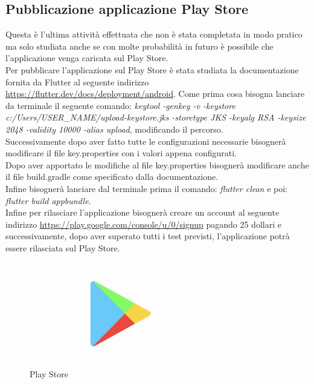 \newpage

\subsection{Pubblicazione applicazione Play Store}
Questa è l'ultima attività effettuata che non è stata completata in modo pratico ma solo studiata anche se con molte probabilità in futuro è possibile che l'applicazione venga caricata sul Play Store.\\
Per pubblicare l'applicazione sul Play Store è stata studiata la documentazione fornita da Flutter al seguente indirizzo \url{https://flutter.dev/docs/deployment/android}.
Come prima cosa bisogna lanciare da terminale il seguente comando: \textit{keytool -genkey -v -keystore c:/Users/USER\_NAME/upload-keystore.jks -storetype JKS -keyalg RSA -keysize 2048 -validity 10000 -alias upload}, modificando il percorso.\\
Successivamente dopo aver fatto tutte le configurazioni necessarie bisognerà modificare il file key.properties con i valori appena configurati.\\
Dopo aver apportato le modifiche al file key.properties bisognerà modificare anche il file build.gradle come specificato dalla documentazione.\\
Infine bisognerà lanciare dal terminale prima il comando: \textit{flutter clean} e poi: \textit{flutter build appbundle}.\\
Infine per rilasciare l'applicazione bisognerà creare un account al seguente indirizzo \url{https://play.google.com/console/u/0/signup} pagando 25 dollari e successivamente, dopo aver superato tutti i test previsti, l'applicazione potrà essere rilasciata sul Play Store.\\

\begin{figure}[htbp]	
	\centering
	\includegraphics[width=8cm]{immagini/playstore.jpg}
	\caption{Play Store}
	\label{fig:Play Store}
\end{figure}

